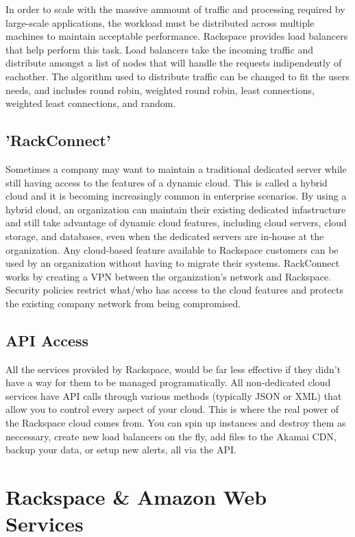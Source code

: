 \documentclass[DIV=calc, paper=letter, fontsize=12pt, twocolumn]{scrartcl}	 %
\begin{document}
In order to scale with the massive ammount of traffic and processing
required by large-scale applications, the workload must be distributed
across multiple machines to maintain acceptable performance. Rackspace
provides load balancers that help perform this task. Load balancers
take the incoming traffic and distribute amongst a list of nodes that
will handle the requests indipendently of eachother. The algorithm
used to distribute traffic can be changed to fit the users needs, and
includes round robin, weighted round robin, least connections, weighted
least connections, and random.

\subsection*{'RackConnect'}

Sometimes a company may want to maintain a traditional dedicated server
while still having access to the features of a dynamic cloud. This is
called a hybrid cloud and it is becoming increasingly common in enterprise
scenarios. By using a hybrid cloud, an organization can maintain their
existing dedicated infastructure and still take advantage of dynamic
cloud features, including cloud servers, cloud storage, and databases,
even when the dedicated servers are in-house at the organization.
Any cloud-based feature available to Rackspace customers can be used
by an organization without having to migrate their systems. RackConnect 
works by creating a VPN between the organization's network and Rackspace.
Security policies restrict what/who has access to the cloud features
and protects the existing company network from being compromised.

\subsection*{API Access}

All the services provided by Rackspace, would be far less effective if 
they didn't have a way for them to be managed programatically. All 
non-dedicated cloud services have API calls through various methods
(typically JSON or XML) that allow you to control every aspect of 
your cloud. This is where the real power of the Rackspace cloud
comes from. You can spin up instances and destroy them as neccessary,
create new load balancers on the fly, add files to the Akamai CDN, 
backup your data, or setup new alerts, all via the API.

\section*{Rackspace \& Amazon Web Services}
\end{document}
